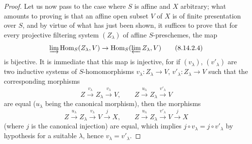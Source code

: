 \begin{proof}
Let us now pass to the case where $S$ is affine and $X$ arbitrary; what amounts to proving is that an affine open subset $V$ of $X$ is of finite presentation over $S$, and by virtue of what has just been shown, it suffices to prove that for every projective filtering system $(Z_\lambda)$ of affine $S$-preschemes, the map
\begin{equation}
\label{IV.8.14.2.4}
\varinjlim\operatorname{Hom}_S(Z_\lambda,V)\to\operatorname{Hom}_S(\varprojlim Z_\lambda,V) \tag{8.14.2.4}
\end{equation}
is bijective.
It is immediate that this map is injective, for if $(v_\lambda)$, $(v'_\lambda)$ are two inductive systems of $S$-homomorphisms $v_\lambda:Z_\lambda\to V$, $v'_\lambda:Z_\lambda\to V$ such that the corresponding morphisms
\[
Z\xrightarrow{v_\lambda}Z_\lambda\xrightarrow{v_\lambda}V,\qquad Z\xrightarrow{u_\lambda}Z_\lambda\xrightarrow{v'_\lambda}V
\]
are equal ($u_\lambda$ being the canonical morphism), then the morphisms
\[
Z\xrightarrow{u_\lambda}Z_\lambda\xrightarrow{v_\lambda}V\xrightarrow{j}X,\qquad Z\xrightarrow{u_\lambda}Z_\lambda\xrightarrow{v'_\lambda}V\xrightarrow{j}X
\]
(where $j$ is the canonical injection) are equal, which implies $j\circ v_\lambda=j\circ v'_\lambda$ by hypothesis for a suitable $\lambda$, hence $v_\lambda=v'_\lambda$.
\end{proof}
